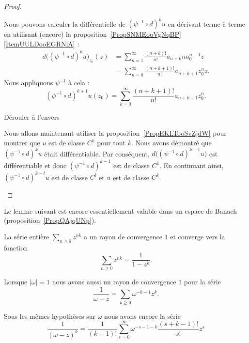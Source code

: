 \begin{proof}
\begin{subproof}
        Nous pouvons calculer la différentielle de \( (\psi^{-1}\circ d)^ku\) en dérivant terme à terme en utilisant (encore) la proposition~\ref{PropSNMEooVgNqBP}\ref{ItemUULDooEGRNiA} :
        \begin{subequations}
            \begin{align}
                d\big( (\psi^{-1}\circ d)^k u\big)_{z_0}(z)&=\sum_{n=1}^{\infty}\frac{ (n+k)! }{ n! }a_{n+k}na_{0}^{n-1}z\\
                &=\sum_{n=0}^{\infty}\frac{ (n+k+1)! }{ n! }a_{n+k+1}z_{0}^nz.
            \end{align}
        \end{subequations}
        Nous appliquons \( \psi^{-1}\) à cela :
        \begin{equation}
            (\psi^{-1}\circ d)^{k+1}u(z_0)=\sum_{k=0}^{\infty}\frac{ (n+k+1)! }{ n! }a_{n+k+1}z_0^n.
        \end{equation}

    \item[Dérouler à l'envers]

        Nous allons maintenant utiliser la proposition~\ref{PropEKLTooSvZjdW} pour montrer que \( u\) est de classe \( C^k\) pour tout \( k\). Nous avons démontré que \( (\psi^{-1}\circ d)^ku\) était différentiable. Par conséquent, \( d\big( (\psi^{-1}\circ d)^{k-1}u \big)\) est différentiable et donc \( (\psi^{-1}\circ d)^{k-1}\) est de classe \( C^1\). En continuant ainsi, \( (\psi^{-1}\circ d)^{k-l}u\) est de classe \( C^l\) et \( u\) est de classe \( C^k\).
    \end{subproof}
\end{proof}

Le lemme suivant est encore essentiellement valable dans un espace de Banach (proposition~\ref{PropQAjqUNp}).
\begin{lemma}       \label{LemPQFDooGUPBvF}
    La série entière \( \sum_{n\geq 0}z^{nk}\) a un rayon de convergence \( 1\) et converge vers la fonction
    \begin{equation}
        \sum_{n\geq 0}z^{nk}=\frac{1}{ 1-z^k }.
    \end{equation}

    Lorsque \( | \omega |=1\) nous avons aussi un rayon de convergence \( 1\) pour la série
    \begin{equation}        \label{EqSSHZooLwCBAZ}
        \frac{1}{ \omega-z }=\sum_{k\geq 0}\omega^{-k-1}z^k.
    \end{equation}

    Sous les mêmes hypothèses sur \( \omega\) nous avons encore la série
    \begin{equation}
        \frac{1}{ (\omega-z)^k }=\frac{1}{ (k-1)! }\sum_{s=0}^{\infty}\omega^{-s-1-k}\frac{ (s+k-1)! }{ s! }z^s
    \end{equation}

\end{lemma}

